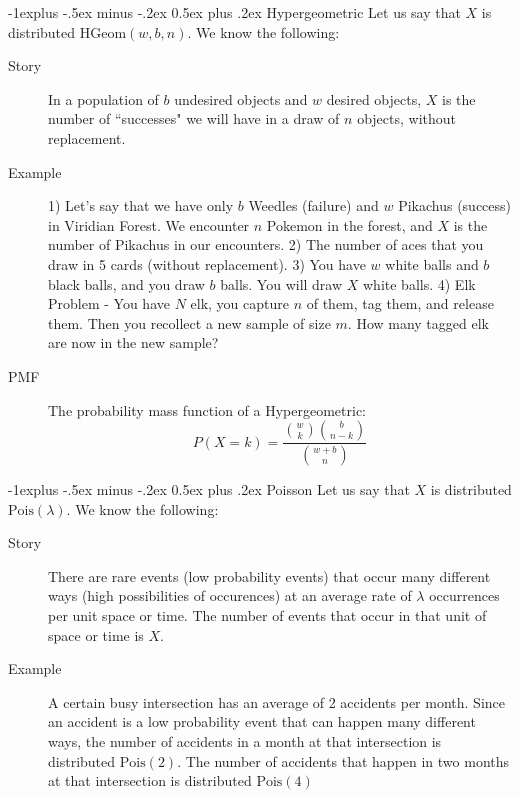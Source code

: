 \documentclass[10pt,landscape]{article}
\makeatletter
\newcommand{\Pois}{\textrm{Pois}}
\newcommand{\Hypergeometric}{\textrm{HGeom}}
\renewcommand{\subsection}{\@startsection{subsection}{2}{0mm}%
                                {-1explus -.5ex minus -.2ex}%
                                {0.5ex plus .2ex}%
                                {\normalfont\normalsize\bfseries}}
\makeatother
\begin{document}
\begin{multicols}{3}
\subsection{Hypergeometric} Let us say that $X$ is distributed $\Hypergeometric(w, b, n)$. We know the following:
\begin{description}
    \item[Story] In a population of $b$ undesired objects and $w$ desired objects, $X$ is the number of ``successes" we will have in a draw of $n$ objects, without replacement.
    \item[Example] 1) Let's say that we have only $b$ Weedles (failure) and $w$ Pikachus (success) in Viridian Forest. We encounter $n$ Pokemon in the forest, and $X$ is the number of Pikachus in our encounters. 2) The number of aces that you draw in 5 cards (without replacement). 3) You have $w$ white balls and $b$ black balls, and you draw $b$ balls. You will draw $X$ white balls. 4) Elk Problem - You have $N$ elk, you capture $n$ of them, tag them, and release them. Then you recollect a new sample of size $m$. How many tagged elk are now in the new sample?
    \item[PMF] The probability mass function of a Hypergeometric:
\[P(X = k) = \frac{{w \choose k}{b \choose n-k}}{{w + b \choose n}}\]
\end{description}

\subsection{Poisson} Let us say that $X$ is distributed $\Pois(\lambda)$. We know the following:
\begin{description}
    \item[Story] There are rare events (low probability events) that occur many different ways (high possibilities of occurences) at an average rate of $\lambda$ occurrences per unit space or time. The number of events that occur in that unit of space or time is $X$.
    
    \item[Example] A certain busy intersection has an average of 2 accidents per month. Since an accident is a low probability event that can happen many different ways, the number of accidents in a month at that intersection is distributed $\Pois(2)$. The number of accidents that happen in two months at that intersection is distributed $\Pois(4)$
    
\end{description}



\end{multicols}
\end{document}
